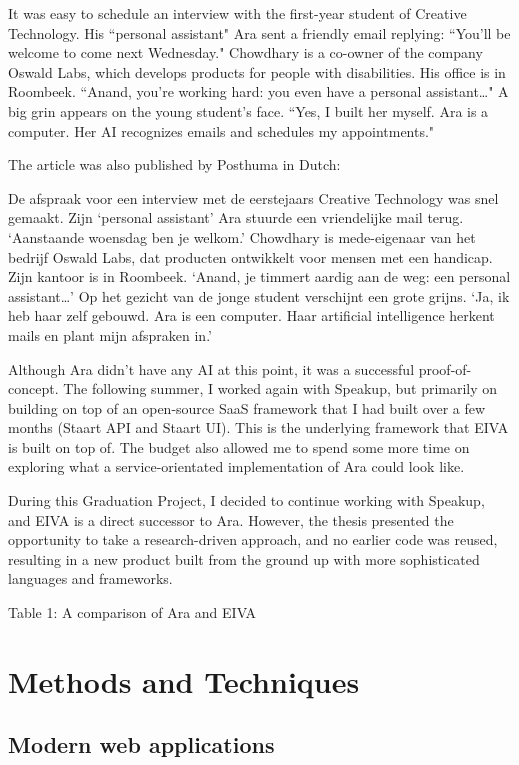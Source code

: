 \documentclass{article}
\begin{document}
It was easy to schedule an interview with the first-year student of Creative Technology. His ``personal assistant" Ara sent a friendly email replying: ``You'll be welcome to come next Wednesday." Chowdhary is a co-owner of the company Oswald Labs, which develops products for people with disabilities. His office is in Roombeek. ``Anand, you're working hard: you even have a personal assistant…" A big grin appears on the young student's face. ``Yes, I built her myself. Ara is a computer. Her AI recognizes emails and schedules my appointments."

The article was also published by Posthuma in Dutch:

De afspraak voor een interview met de eerstejaars Creative Technology was snel gemaakt. Zijn `personal assistant' Ara stuurde een vriendelijke mail terug. `Aanstaande woensdag ben je welkom.' Chowdhary is mede-eigenaar van het bedrijf Oswald Labs, dat producten ontwikkelt voor mensen met een handicap. Zijn kantoor is in Roombeek. `Anand, je timmert aardig aan de weg: een personal assistant…' Op het gezicht van de jonge student verschijnt een grote grijns. `Ja, ik heb haar zelf gebouwd. Ara is een computer. Haar artificial intelligence herkent mails en plant mijn afspraken in.'

Although Ara didn't have any AI at this point, it was a successful proof-of-concept. The following summer, I worked again with Speakup, but primarily on building on top of an open-source SaaS framework that I had built over a few months (Staart API and Staart UI). This is the underlying framework that EIVA is built on top of. The budget also allowed me to spend some more time on exploring what a service-orientated implementation of Ara could look like.

During this Graduation Project, I decided to continue working with Speakup, and EIVA is a direct successor to Ara. However, the thesis presented the opportunity to take a research-driven approach, and no earlier code was reused, resulting in a new product built from the ground up with more sophisticated languages and frameworks.

Table 1: A comparison of Ara and EIVA

\newpage

\section{Methods and Techniques}

\subsection{Modern web applications}
\end{document}
